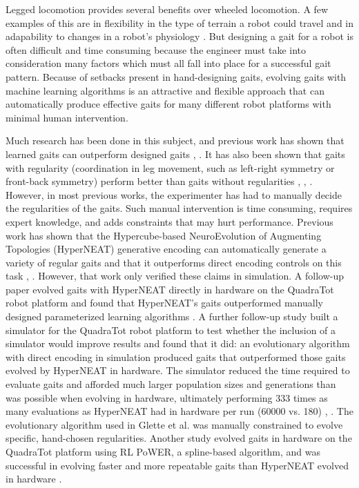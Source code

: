 Legged locomotion provides several benefits over wheeled locomotion. 
A few examples of this are in flexibility in the type of terrain a robot could travel and in adapability to changes in a robot's physiology \cite{bongard:lipson}.
But designing a gait for a robot is often difficult and time consuming because the engineer must take into consideration many factors which must all fall into place for a successful gait pattern. 
Because of setbacks present in hand-designing gaits, evolving gaits with machine learning algorithms is an attractive and flexible approach that can automatically produce effective gaits for many different robot platforms with minimal human intervention. 

Much research has been done in this subject, and previous work has shown that learned gaits can outperform designed gaits \cite{valsalam:mii}, \cite{kohl:stone}. 
It has also been shown that gaits with regularity (coordination in leg movement, such as left-right symmetry or front-back symmetry) perform better than gaits without regularities \cite{valsalam:mii}, \cite{clune1}, \cite{clune3}.
However, in most previous works, the experimenter has had to manually decide the regularities of the gaits. 
Such manual intervention is time consuming, requires expert knowledge, and adds constraints that may hurt performance. 
Previous work has shown that the Hypercube-based NeuroEvolution of Augmenting Topologies (HyperNEAT) generative encoding \cite{stanley1} can automatically generate a variety of regular gaits and that it outperforms direct encoding controls on this task \cite{clune1}, \cite{clune2}. 
However, that work only verified these claims in simulation. 
A follow-up paper evolved gaits with HyperNEAT directly in hardware on the QuadraTot robot platform and found that HyperNEAT's gaits outperformed manually designed parameterized learning algorithms \cite{yos:clune}. %
A further follow-up study \cite{glette} built a simulator for the QuadraTot robot platform to test whether the inclusion of a simulator would improve results and found that it did:  an evolutionary algorithm with direct encoding in simulation produced gaits that outperformed those gaits evolved by HyperNEAT in hardware. 
The simulator reduced the time required to evaluate gaits and afforded much larger population sizes and generations than was possible when evolving in hardware, ultimately performing 333 times as many evaluations as HyperNEAT had in hardware per run (60000 vs. 180) \cite{yos:clune}, \cite{glette}. 
The evolutionary algorithm used in Glette et al. \cite{glette} was manually constrained to evolve specific, hand-chosen regularities. 
Another study evolved gaits in hardware on the QuadraTot platform using RL PoWER, a spline-based algorithm, and was successful in evolving faster and more repeatable gaits than HyperNEAT evolved in hardware \cite{haocheng}. 

